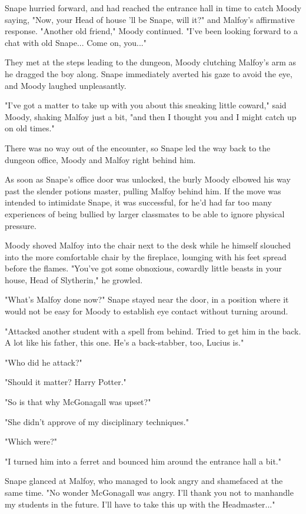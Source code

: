 Snape hurried forward, and had reached the entrance hall in time to catch Moody saying, "Now, your Head of house 'll be Snape, will it?" and Malfoy's affirmative response. "Another old friend," Moody continued. "I've been looking forward to a chat with old Snape... Come on, you..."

They met at the steps leading to the dungeon, Moody clutching Malfoy's arm as he dragged the boy along. Snape immediately averted his gaze to avoid the eye, and Moody laughed unpleasantly.

"I've got a matter to take up with you about this sneaking little coward," said Moody, shaking Malfoy just a bit, "and then I thought you and I might catch up on old times."

There was no way out of the encounter, so Snape led the way back to the dungeon office, Moody and Malfoy right behind him.

As soon as Snape's office door was unlocked, the burly Moody elbowed his way past the slender potions master, pulling Malfoy behind him. If the move was intended to intimidate Snape, it was successful, for he'd had far too many experiences of being bullied by larger classmates to be able to ignore physical pressure.

Moody shoved Malfoy into the chair next to the desk while he himself slouched into the more comfortable chair by the fireplace, lounging with his feet spread before the flames. "You've got some obnoxious, cowardly little beasts in your house, Head of Slytherin," he growled.

"What's Malfoy done now?" Snape stayed near the door, in a position where it would not be easy for Moody to establish eye contact without turning around.

"Attacked another student with a spell from behind. Tried to get him in the back. A lot like his father, this one. He's a back-stabber, too, Lucius is."

"Who did he attack?"

"Should it matter? Harry Potter."

"So is that why McGonagall was upset?"

"She didn't approve of my disciplinary techniques."

"Which were?"

"I turned him into a ferret and bounced him around the entrance hall a bit."

Snape glanced at Malfoy, who managed to look angry and shamefaced at the same time. "No wonder McGonagall was angry. I'll thank you not to manhandle my students in the future. I'll have to take this up with the Headmaster..."

